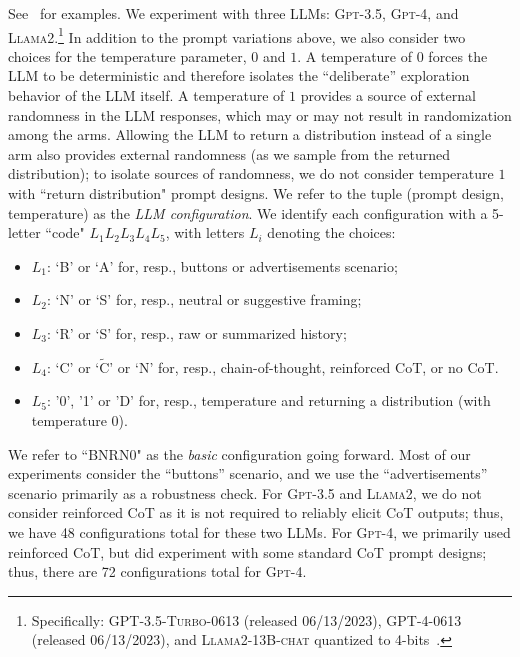 \documentclass[11pt]{article}
\newcommand{\loose}{\looseness=-1}
\newcommand{\gptfour}{\textsc{Gpt-4}\xspace}
\newcommand{\gptthree}{\textsc{Gpt-3.5}\xspace}
\newcommand{\llama}{\textsc{Llama2}\xspace}
\newcommand{\xhdr}[1]{\vspace{2mm} \noindent{\bf #1}}
\begin{document}
See~ for examples.
\xhdr{LLM configurations.}
We experiment with three LLMs: \gptthree, \gptfour, and \llama.\footnote{Specifically: \textsc{GPT-3.5-Turbo-0613} (released 06/13/2023), \textsc{GPT-4-0613} (released 06/13/2023), and \textsc{Llama2-13B-chat} quantized to 4-bits~\citep{dettmers2023case}.}
In addition to the prompt variations above, we also consider two choices for the temperature parameter, $0$ and $1$.
A temperature of $0$ forces the LLM to be deterministic and therefore isolates the ``deliberate'' exploration behavior of the LLM itself.
A temperature of $1$ provides a source of external randomness in the LLM responses, which may or may not result in randomization among the arms.
Allowing the LLM to return a distribution instead of a single arm
also provides external randomness (as we sample from the returned distribution); to
isolate sources of randomness, we do not consider temperature $1$ with ``return distribution" prompt designs.\loose
We refer to the tuple (prompt design, temperature) as the \emph{LLM configuration}. We identify each configuration with a 5-letter ``code" $L_1 L_2 L_3 L_4 L_5$, with letters $L_i$ denoting the choices:
\begin{itemize}
\setlength{\itemsep}{0pt}
\item $L_1$: `B' or `A' for, resp., buttons or advertisements scenario;
\item $L_2$: `N' or `S' for, resp., neutral or suggestive framing;
\item $L_3$: `R' or `S' for, resp., raw or summarized history;
\item$L_4$: `C' or `$\widetilde{\text{C}}$' or `N' for, resp., chain-of-thought, reinforced CoT, or no CoT.
\item $L_5$: '0', '1' or 'D' for, resp., temperature and returning a distribution (with temperature $0$).
\end{itemize}
We refer to ``BNRN0" as the \emph{basic} configuration going forward.
Most of our experiments consider the ``buttons'' scenario, and we use the ``advertisements'' scenario primarily as a robustness check.
For \gptthree and \llama, we do not consider reinforced CoT as it is not required to reliably elicit CoT outputs; thus, we have 48 configurations total for these two LLMs.
For \gptfour, we primarily used reinforced CoT, but did experiment with some standard CoT prompt designs; thus, there are 72 configurations total for \gptfour.
\end{document}
